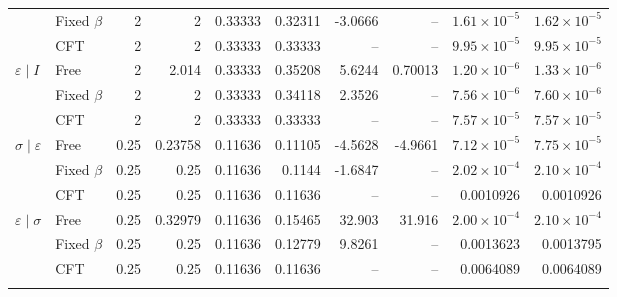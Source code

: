 \begin{longtable}{llrrrrrrrr}
 & Fixed $\beta$ & 2 & 2 & 0.33333 & 0.32311 & -3.0666 & -- & $1.61\!\times\!10^{-5}$ & $1.62\!\times\!10^{-5}$\\*
 & CFT & 2 & 2 & 0.33333 & 0.33333 & -- & -- & $9.95\!\times\!10^{-5}$ & $9.95\!\times\!10^{-5}$\\
\addlinespace[3pt]
$\varepsilon\mid I$ & Free & 2 & 2.014 & 0.33333 & 0.35208 & 5.6244 & 0.70013 & $1.20\!\times\!10^{-6}$ & $1.33\!\times\!10^{-6}$\\*
 & Fixed $\beta$ & 2 & 2 & 0.33333 & 0.34118 & 2.3526 & -- & $7.56\!\times\!10^{-6}$ & $7.60\!\times\!10^{-6}$\\*
 & CFT & 2 & 2 & 0.33333 & 0.33333 & -- & -- & $7.57\!\times\!10^{-5}$ & $7.57\!\times\!10^{-5}$\\
\addlinespace[3pt]
$\sigma\mid \varepsilon$ & Free & 0.25 & 0.23758 & 0.11636 & 0.11105 & -4.5628 & -4.9661 & $7.12\!\times\!10^{-5}$ & $7.75\!\times\!10^{-5}$\\*
 & Fixed $\beta$ & 0.25 & 0.25 & 0.11636 & 0.1144 & -1.6847 & -- & $2.02\!\times\!10^{-4}$ & $2.10\!\times\!10^{-4}$\\*
 & CFT & 0.25 & 0.25 & 0.11636 & 0.11636 & -- & -- & 0.0010926 & 0.0010926\\
\addlinespace[3pt]
$\varepsilon\mid \sigma$ & Free & 0.25 & 0.32979 & 0.11636 & 0.15465 & 32.903 & 31.916 & $2.00\!\times\!10^{-4}$ & $2.10\!\times\!10^{-4}$\\*
 & Fixed $\beta$ & 0.25 & 0.25 & 0.11636 & 0.12779 & 9.8261 & -- & 0.0013623 & 0.0013795\\*
 & CFT & 0.25 & 0.25 & 0.11636 & 0.11636 & -- & -- & 0.0064089 & 0.0064089\\
\addlinespace[3pt]
\end{longtable}

